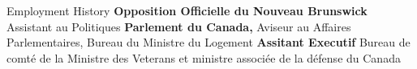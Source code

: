\begin{rubric}{Employment History}
%
\entry*[2023 --2024]%
	\textbf{Opposition Officielle du Nouveau Brunswick} Assistant au Politiques
%
\entry*[2023]%
	\textbf{Parlement du Canada,} Aviseur au Affaires Parlementaires, Bureau du Ministre du Logement
%
\entry*[2022]%
	\textbf{Assitant Executif} Bureau de comté de la Ministre des Veterans et ministre associée de la défense du Canada
%
\end{rubric}